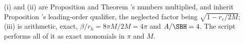 (i) and (ii) are Proposition  and Theorem 's numbers multiplied, and inherit Proposition 's leading-order qualifier, the neglected factor being $\sqrt{1 - r_c/2M}$; (iii) is arithmetic, exact, $\beta/r_h = 8\pi M/2M = 4\pi$ and $A/\SBH = 4$. The script performs all of it as exact monomials in $\pi$ and $M$.
